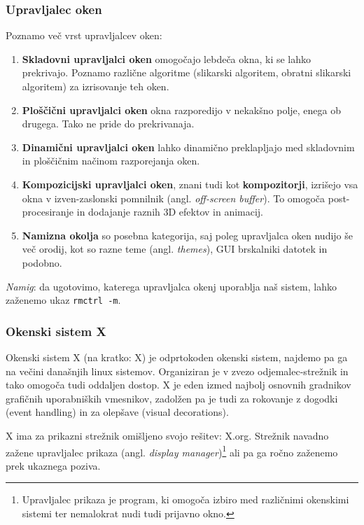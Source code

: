 \documentclass{article}
\begin{document}
\subsubsection{Upravljalec oken}
Poznamo več vrst upravljalcev oken: \autocite{wikiwindowmanager}

\begin{enumerate}
    \item \textbf{Skladovni upravljalci oken} omogočajo lebdeča okna, ki se lahko prekrivajo. Poznamo različne algoritme (slikarski algoritem, obratni slikarski algoritem) za izrisovanje teh oken.
    \item \textbf{Ploščični upravljalci oken} okna razporedijo v nekakšno polje, enega ob drugega. Tako ne pride do prekrivanaja.
    \item \textbf{Dinamični upravljalci oken} lahko dinamično preklapljajo med skladovnim in ploščičnim načinom razporejanja oken.
    \item \textbf{Kompozicijski upravljalci oken}, znani tudi kot \textbf{kompozitorji}, izrišejo vsa okna v izven-zaslonski pomnilnik (angl. \textit{off-screen buffer}). To omogoča post-procesiranje in dodajanje raznih 3D efektov in animacij. \autocite{wikicompositingmanager}
    \item \textbf{Namizna okolja} so posebna kategorija, saj poleg upravljalca oken nudijo še več orodij, kot so razne teme (angl. \textit{themes}), GUI brskalniki datotek in podobno.
\end{enumerate}

\textit{Namig}: da ugotovimo, katerega upravljalca okenj uporablja naš sistem, lahko zaženemo ukaz \texttt{rmctrl -m}.

\subsubsection{Okenski sistem X}
Okenski sistem X (na kratko: X) je odprtokoden okenski sistem, najdemo pa ga na večini današnjih linux sistemov. Organiziran je v zvezo odjemalec-strežnik in tako omogoča tudi oddaljen dostop.
X je eden izmed najbolj osnovnih gradnikov grafičnih uporabniških vmesnikov, zadolžen pa je tudi za rokovanje z dogodki (event handling) in za olepšave (visual decorations). \autocite{wikixsystem, howxworks}

X ima za prikazni strežnik omišljeno svojo rešitev: X.org. Strežnik navadno zažene upravljalec prikaza (angl. \textit{display manager})\footnote{Upravljalec prikaza je program, ki omogoča izbiro med različnimi okenskimi sistemi ter nemalokrat nudi tudi prijavno okno.} ali pa ga ročno zaženemo prek ukaznega poziva. \autocite{baeldunggui, wikixorg}
\end{document}
